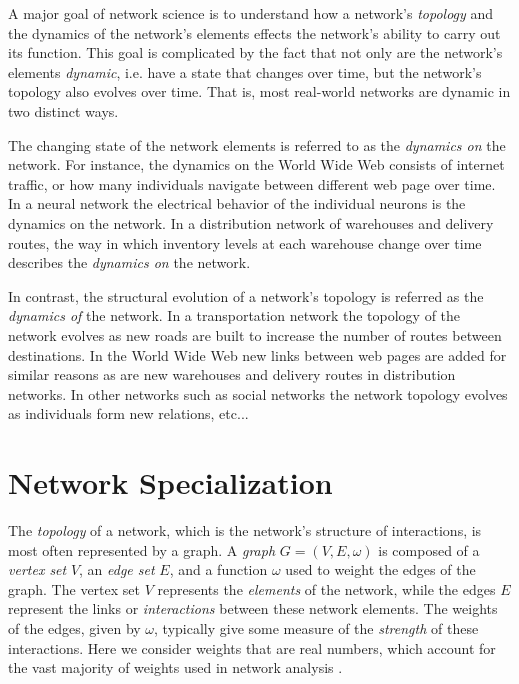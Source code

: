 \documentclass[10pt]{elsarticle}
\theoremstyle{remark}
\begin{document}
A major goal of network science is to understand how a network's \emph{topology} and the dynamics of the network's elements effects the network's ability to carry out its function. This goal is complicated by the fact that not only are the network's elements \emph{dynamic}, i.e. have a state that changes over time, but the network's topology also evolves over time. That is, most real-world networks are dynamic in two distinct ways.

The changing state of the network elements is referred to as the \emph{dynamics on} the network. For instance, the dynamics on  the World Wide Web consists of internet traffic, or how many individuals navigate between different web page over time. In a neural network the electrical behavior of the individual neurons is the dynamics on the network. In a distribution network of warehouses and delivery routes, the way in which inventory levels at each warehouse change over time describes the \emph{dynamics on} the network.

In contrast, the structural evolution of a network's topology is referred as the \emph{dynamics of} the network. In a transportation network the topology of the network evolves as new roads are built to increase the number of routes between destinations. In the World Wide Web new links between web pages are added for similar reasons as are new warehouses and delivery routes in distribution networks. In other networks such as social networks the network topology evolves as individuals form new relations, etc...

\section{Network Specialization}

The \emph{topology} of a network, which is the network's structure of interactions, is most often represented by a graph. A \emph{graph} $G=(V,E,\omega)$ is composed of a \emph{vertex set} $V$, an \emph{edge set} $E$, and a function $\omega$ used to weight the edges of the graph. The vertex set $V$ represents the \emph{elements} of the network, while the edges $E$ represent the links or \emph{interactions} between these network elements. The weights of the edges, given by $\omega$, typically give some measure of the \emph{strength} of these interactions. Here we consider weights that are real numbers, which account for the vast majority of weights used in network analysis \cite{Newman10}.
\end{document}
